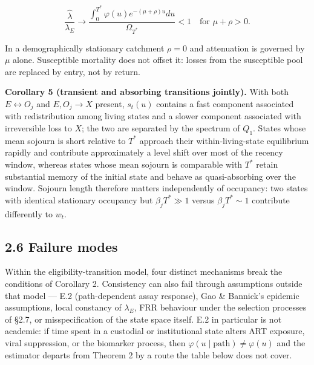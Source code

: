 \[
\frac{\hat\lambda}{\lambda_E}\to\frac{\int_0^{T^*}\varphi(u)e^{-(\mu+\rho)u}du}{\Omega_{T^*}}<1
\quad\text{for }\mu+\rho>0 .
\]

In a demographically stationary catchment \(\rho=0\) and attenuation is governed by \(\mu\) alone. Susceptible mortality does not offset it: losses from the susceptible pool are replaced by entry, not by return.

\textbf{Corollary 5 (transient and absorbing transitions jointly).} With both \(E\leftrightarrow O_j\) and \(E,O_j\to X\) present, \(s_t(u)\) contains a fast component associated with redistribution among living states and a slower component associated with irreversible loss to \(X\); the two are separated by the spectrum of \(Q_1\). States whose mean sojourn is short relative to \(T^*\) approach their within-living-state equilibrium rapidly and contribute approximately a level shift over most of the recency window, whereas states whose mean sojourn is comparable with \(T^*\) retain substantial memory of the initial state and behave as quasi-absorbing over the window. Sojourn length therefore matters independently of occupancy: two states with identical stationary occupancy but \(\beta_jT^*\gg1\) versus \(\beta_jT^*\sim1\) contribute differently to \(w_t\).

\subsection{2.6 Failure modes}

Within the eligibility-transition model, four distinct mechanisms break the conditions of Corollary 2. Consistency can also fail through assumptions outside that model --- E.2 (path-dependent assay response), Gao \& Bannick's epidemic assumptions, local constancy of \(\lambda_E\), FRR behaviour under the selection processes of §2.7, or misspecification of the state space itself. E.2 in particular is not academic: if time spent in a custodial or institutional state alters ART exposure, viral suppression, or the biomarker process, then \(\varphi(u\mid\text{path})\ne\varphi(u)\) and the estimator departs from Theorem 2 by a route the table below does not cover.

